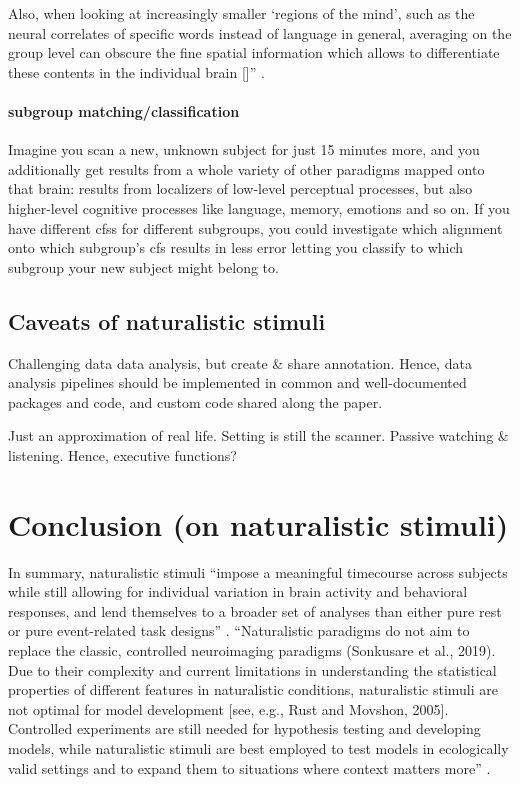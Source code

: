 %
Also, when looking at increasingly smaller ‘regions of the mind’, such as the
neural correlates of specific words instead of language in general, averaging on
the group level can obscure the fine spatial information which allows to
differentiate these contents in the individual brain [\citet{huth2016natural}]''
\citep{wegrzyn2018thought}.


\paragraph{subgroup matching/classification}
%
Imagine you scan a new, unknown subject for just 15 minutes more, and you
additionally get results from a whole variety of other paradigms mapped onto
that brain: results from localizers of low-level perceptual processes, but also
higher-level cognitive processes like language, memory, emotions and so on.
%
If you have different \acp{cfs} for different subgroups, you could investigate
which alignment onto which subgroup's \ac{cfs} results in less
error letting you classify to which subgroup your new subject might belong to.


\subsection{Caveats of naturalistic stimuli}

%
Challenging data data analysis, but create \& share annotation.
%
Hence, data analysis pipelines should be implemented in common and
well-documented packages and code, and custom code shared along the paper.

%
Just an approximation of real life.
%
Setting is still the scanner.
%
Passive watching \& listening. Hence, executive functions?


\section{Conclusion (on naturalistic stimuli)}
%
In summary, naturalistic stimuli ``impose a meaningful timecourse across
subjects while still allowing for individual variation in brain activity and
behavioral responses, and lend themselves to a broader set of analyses than
either pure rest or pure event-related task designs'' \citep{finn2017can}.
%
``Naturalistic paradigms do not aim to replace the classic, controlled
neuroimaging paradigms (Sonkusare et al., 2019). Due to their complexity and
current limitations in understanding the statistical properties of different
features in naturalistic conditions, naturalistic stimuli are not optimal for
model development [see, e.g., Rust and Movshon, 2005]. Controlled experiments
are still needed for hypothesis testing and developing models, while
naturalistic stimuli are best employed to test models in ecologically valid
settings and to expand them to situations where context matters
more'' \citep{saarimaki2021naturalistic}.

